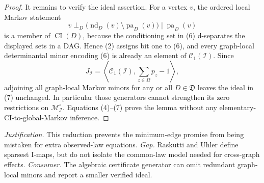 \documentclass{article}
\begin{document}
\begin{proof}
It remains to verify the ideal assertion.  For a vertex \(v\), the ordered local Markov statement
\[
 v\perp_D
 \bigl(\operatorname{nd}_D(v)\setminus\operatorname{pa}_D(v)\bigr)
 \mid\operatorname{pa}_D(v) \tag{6}
\]
is a member of \(\operatorname{CI}(D)\), because the conditioning set in (6) d-separates the displayed sets in a DAG.  Hence (2) assigns bit one to (6), and every graph-local determinantal minor encoding (6) is already an element of \(\mathcal C_1(\mathcal I)\).  Since
\[
 J_{\mathcal I}
 =\left\langle\mathcal C_1(\mathcal I),
       \sum_{z\in\Omega}p_z-1\right\rangle, \tag{7}
\]
adjoining all graph-local Markov minors for any or all \(D\in\mathfrak D\) leaves the ideal in (7) unchanged.  In particular those generators cannot strengthen its zero restrictions on \(\mathcal M_{\mathcal I}^{\circ}\).  Equations (4)--(7) prove the lemma without any elementary-CI-to-global-Markov inference.
\end{proof}
\par\smallskip\noindent \textit{Justification.} This reduction prevents the minimum-edge promise from being mistaken for extra observed-law equations. \textit{Gap.} Raskutti and Uhler define sparsest I-maps, but do not isolate the common-law model needed for cross-graph effects. \textit{Consumer.} The algebraic certificate generator can omit redundant graph-local minors and report a smaller verified ideal.
\end{document}
